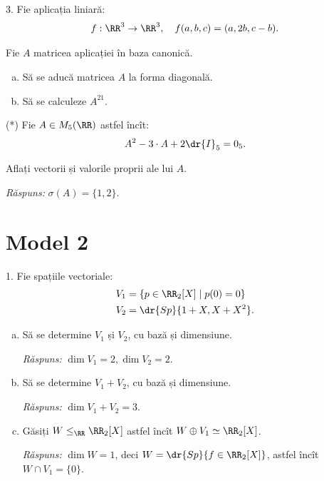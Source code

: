 \vspace{1cm}

3. Fie aplicația liniară:
\[
  f : \RR^3 \to \RR^3, \quad f(a, b, c) = (a, 2b, c-b).
\]

Fie $ A $ matricea aplicației în baza canonică.

\begin{enumerate}[(a)]
\item Să se aducă matricea $ A $ la forma diagonală.
\item Să se calculeze $ A^{21} $.
\end{enumerate}

\vspace{1cm}

(*) Fie $ A \in M_{5}(\RR) $ astfel încît:
\[
  A^2 - 3 \cdot A + 2 \dr{I}_5 = 0_5.
\]

Aflați vectorii și valorile proprii ale lui $ A $.

\emph{Răspuns:} $ \sigma(A) = \{ 1, 2 \} $.


\section{Model 2}

1. Fie spațiile vectoriale:
\begin{align*}
  V_1 &= \{ p \in \RR_2[X] \mid p(0) = 0 \} \\
  V_2 &= \dr{Sp} \{1 + X, X + X^2 \}.
\end{align*}
\begin{enumerate}[(a)]
\item Să se determine $ V_1 $ și $ V_2 $, cu bază și dimensiune.

  \emph{Răspuns:} $ \dim V_1 = 2, \dim V_2 = 2 $.
\item Să se determine $ V_1 + V_2 $, cu bază și dimensiune.

  \emph{Răspuns:} $ \dim V_1 + V_2 = 3 $.
\item Găsiți $ W \leq_\RR \RR_2[X] $ astfel încît $ W \oplus V_1 \simeq \RR_2[X] $.

  \emph{Răspuns:} $ \dim W = 1 $, deci $ W = \dr{Sp} \{ f \in \RR_2[X] \} $,
  astfel încît $ W \cap V_1 = \{ 0 \} $.
\end{enumerate}

\vspace{1cm}

